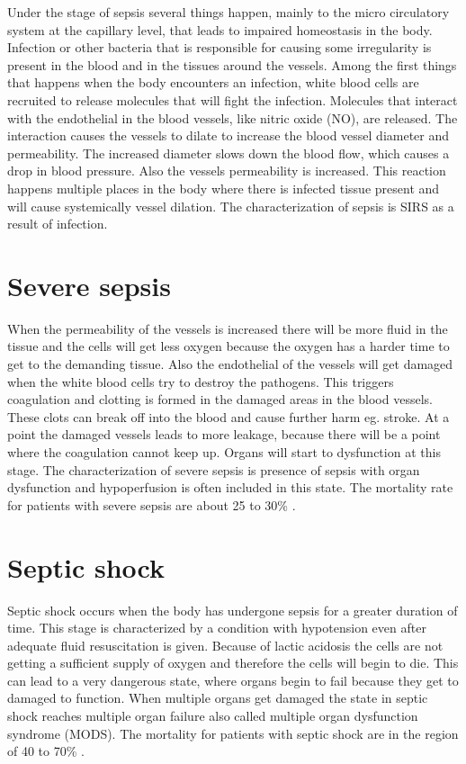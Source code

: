 Under the stage of sepsis several things happen, mainly to the micro circulatory system at the capillary level, that leads to impaired homeostasis in the body. Infection or other bacteria that is responsible for causing some irregularity is present in the blood and in the tissues around the vessels. Among the first things that happens when the body encounters an infection, white blood cells are recruited to release molecules that will fight the infection. Molecules that interact with the endothelial in the blood vessels, like nitric oxide (NO), are released. The interaction causes the vessels to dilate to increase the blood vessel diameter and permeability. The increased diameter slows down the blood flow, which causes a drop in blood pressure. Also the vessels permeability is increased. This reaction happens multiple places in the body where there is infected tissue present and will cause systemically vessel dilation. The characterization of sepsis is SIRS as a result of infection.\cite{baudouin2008,kanta2014}

\section{Severe sepsis}

When the permeability of the vessels is increased there will be more fluid in the tissue and the cells will get less oxygen because the oxygen has a harder time to get to the demanding tissue. Also the endothelial of the vessels will get damaged when the white blood cells try to destroy the pathogens. This triggers coagulation and clotting is formed in the damaged areas in the blood vessels. These clots can break off into the blood and cause further harm eg. stroke. At a point the damaged vessels leads to more leakage, because there will be a point where the coagulation cannot keep up. Organs will start to dysfunction at this stage. The characterization of severe sepsis is presence of sepsis with organ dysfunction and hypoperfusion is often included in this state. The mortality rate for patients with severe sepsis are about 25 to 30\% \cite{baudouin2008,kanta2014}. 

\section{Septic shock}

Septic shock occurs when the body has undergone sepsis for a greater duration of time. This stage is characterized by a condition with hypotension even after adequate fluid resuscitation is given. Because of lactic acidosis the cells are not getting a sufficient supply of oxygen and therefore the cells will begin to die. This can lead to a very dangerous state, where organs begin to fail because they get to damaged to function. When multiple organs get damaged the state in septic shock reaches multiple organ failure also called multiple organ dysfunction syndrome (MODS)\cite{baudouin2008,kanta2014}. The mortality for patients with septic shock are in the region of 40 to 70\% \cite{kanta2014}. 


